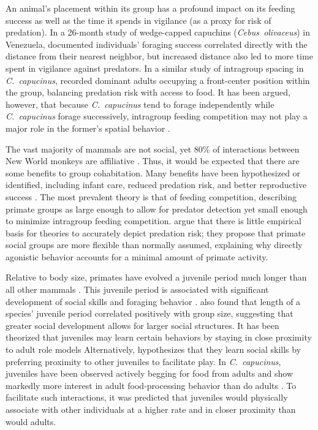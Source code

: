 \documentclass[american]{../../../coursework}
\begin{document}
An animal's placement within its group has a profound impact on its feeding
success as well as the time it spends in vigilance (as a proxy for risk of
predation). In a 26-month study of wedge-capped capuchins
(\emph{Cebus~olivaceus}) in Venezuela, \textcite{Robinson1981} documented
individuals' foraging success correlated directly with the distance from their
nearest neighbor, but increased distance also led to more time spent in
vigilance against predators. In a similar study of intragroup spacing in
\emph{C.~capucinus}, \textcite{Hall1997} recorded dominant adults occupying a
front-center position within the group, balancing predation risk with access
to food. It has been argued, however, that because \emph{C.~capucinus} tend to
forage independently while \emph{C.~capucinus} forage successively, intragroup
feeding competition may not play a major role in the former's spatial behavior
\parencite{Fragaszy2004}.

The vast majority of mammals are not social, yet 80\% of interactions between
New World monkeys are affiliative \parencite{Sussman2005}. Thus, it would be
expected that there are some benefits to group cohabitation. Many benefits
have been hypothesized or identified, including infant care, reduced predation
risk, and better reproductive success \parencite{Fragaszy2004}. The most
prevalent theory is that of feeding competition, describing primate groups as
large enough to allow for predator detection yet small enough to minimize
intragroup feeding competition. \textcite{Sussman2011} argue that there is
little empirical basis for theories to accurately depict predation risk; they
propose that primate social groups are more flexible than normally assumed,
explaining why directly agonistic behavior accounts for a minimal amount of
primate activity.

Relative to body size, primates have evolved a juvenile period much longer
than all other mammals \parencite{Harvey1985}. This juvenile period is
associated with significant development of social skills \parencite{Joffe1997}
and foraging behavior \parencite{Rapaport2008}. \textcite{Joffe1997} also
found that length of a species' juvenile period correlated positively with
group size, suggesting that greater social development allows for larger
social structures. It has been theorized that juveniles may learn certain
behaviors by staying in close proximity to adult role models
\parencite{Sherrow2011} Alternatively, \textcite{Strier2007} hypothesizes that
they learn social skills by preferring proximity to other juveniles to
facilitate play. In \emph{C.~capucinus}, juveniles have been observed actively
begging for food from adults \parencite{Perry1994} and show markedly more
interest in adult food-processing behavior than do adults
\parencite{OMalley2005}. To facilitate such interactions, it was predicted
that juveniles would physically associate with other individuals at a higher
rate and in closer proximity than would adults.
\end{document}
